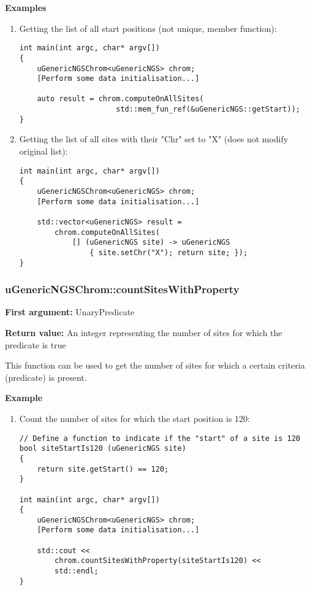 \documentclass[letterpaper,10pt]{article}
\begin{document}
\bigskip
\noindent{}\textbf{Examples}
\begin{enumerate}
 \item Getting the list of all start positions (not unique, member function):
\begin{verbatim}
int main(int argc, char* argv[])
{
    uGenericNGSChrom<uGenericNGS> chrom;
    [Perform some data initialisation...]

    auto result = chrom.computeOnAllSites(
                      std::mem_fun_ref(&uGenericNGS::getStart));
}
\end{verbatim}

 \item Getting the list of all sites with their "Chr" set to "X" (does not modify original list):
\begin{verbatim}
int main(int argc, char* argv[])
{
    uGenericNGSChrom<uGenericNGS> chrom;
    [Perform some data initialisation...]

    std::vector<uGenericNGS> result = 
        chrom.computeOnAllSites(
            [] (uGenericNGS site) -> uGenericNGS
                { site.setChr("X"); return site; });
}
\end{verbatim}
\end{enumerate}

\subsubsection{uGenericNGSChrom::countSitesWithProperty}
\textbf{First argument:} UnaryPredicate

\noindent{}\textbf{Return value:} An integer representing the number of sites for which the predicate is true

\bigskip
\noindent{}This function can be used to get the number of sites for which a certain criteria (predicate) is present.

\bigskip
\noindent{}\textbf{Example}
\begin{enumerate}
 \item Count the number of sites for which the start position is 120: 
\begin{verbatim}
// Define a function to indicate if the "start" of a site is 120
bool siteStartIs120 (uGenericNGS site)
{
    return site.getStart() == 120;
}

int main(int argc, char* argv[])
{
    uGenericNGSChrom<uGenericNGS> chrom;
    [Perform some data initialisation...]

    std::cout << 
        chrom.countSitesWithProperty(siteStartIs120) <<
        std::endl;
}
\end{verbatim}
\end{enumerate}
\end{document}
